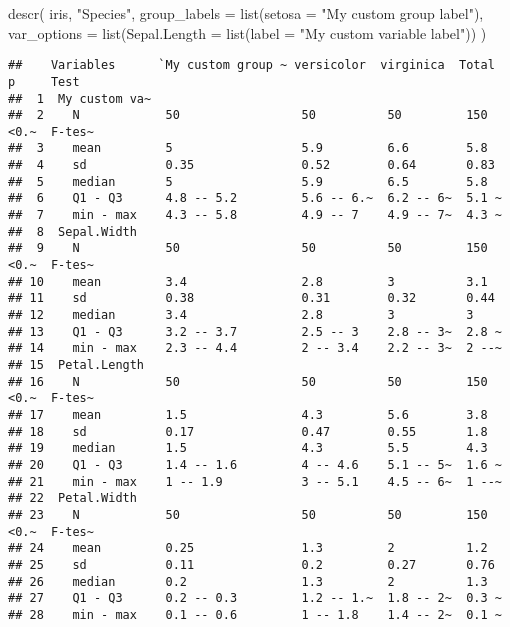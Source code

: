 \documentclass[
]{article}
\newenvironment{Shaded}{\begin{snugshade}}{\end{snugshade}}
\newcommand{\AttributeTok}[1]{\textcolor[rgb]{0.77,0.63,0.00}{#1}}
\newcommand{\FunctionTok}[1]{\textcolor[rgb]{0.00,0.00,0.00}{#1}}
\newcommand{\NormalTok}[1]{#1}
\newcommand{\StringTok}[1]{\textcolor[rgb]{0.31,0.60,0.02}{#1}}
\begin{document}
\begin{Shaded}
\begin{Highlighting}[]
\FunctionTok{descr}\NormalTok{(}
\NormalTok{  iris,}
  \StringTok{"Species"}\NormalTok{,}
  \AttributeTok{group\_labels =} \FunctionTok{list}\NormalTok{(}\AttributeTok{setosa =} \StringTok{"My custom group label"}\NormalTok{),}
  \AttributeTok{var\_options =} \FunctionTok{list}\NormalTok{(}\AttributeTok{Sepal.Length =} \FunctionTok{list}\NormalTok{(}\AttributeTok{label =} \StringTok{"My custom variable label"}\NormalTok{))}
\NormalTok{)}
\end{Highlighting}
\end{Shaded}

\begin{verbatim}
##    Variables      `My custom group ~ versicolor  virginica  Total  p     Test   
##  1  My custom va~                                                               
##  2    N            50                 50          50         150    <0.~  F-tes~
##  3    mean         5                  5.9         6.6        5.8                
##  4    sd           0.35               0.52        0.64       0.83               
##  5    median       5                  5.9         6.5        5.8                
##  6    Q1 - Q3      4.8 -- 5.2         5.6 -- 6.~  6.2 -- 6~  5.1 ~              
##  7    min - max    4.3 -- 5.8         4.9 -- 7    4.9 -- 7~  4.3 ~              
##  8  Sepal.Width                                                                 
##  9    N            50                 50          50         150    <0.~  F-tes~
## 10    mean         3.4                2.8         3          3.1                
## 11    sd           0.38               0.31        0.32       0.44               
## 12    median       3.4                2.8         3          3                  
## 13    Q1 - Q3      3.2 -- 3.7         2.5 -- 3    2.8 -- 3~  2.8 ~              
## 14    min - max    2.3 -- 4.4         2 -- 3.4    2.2 -- 3~  2 --~              
## 15  Petal.Length                                                                
## 16    N            50                 50          50         150    <0.~  F-tes~
## 17    mean         1.5                4.3         5.6        3.8                
## 18    sd           0.17               0.47        0.55       1.8                
## 19    median       1.5                4.3         5.5        4.3                
## 20    Q1 - Q3      1.4 -- 1.6         4 -- 4.6    5.1 -- 5~  1.6 ~              
## 21    min - max    1 -- 1.9           3 -- 5.1    4.5 -- 6~  1 --~              
## 22  Petal.Width                                                                 
## 23    N            50                 50          50         150    <0.~  F-tes~
## 24    mean         0.25               1.3         2          1.2                
## 25    sd           0.11               0.2         0.27       0.76               
## 26    median       0.2                1.3         2          1.3                
## 27    Q1 - Q3      0.2 -- 0.3         1.2 -- 1.~  1.8 -- 2~  0.3 ~              
## 28    min - max    0.1 -- 0.6         1 -- 1.8    1.4 -- 2~  0.1 ~
\end{verbatim}
\end{document}
